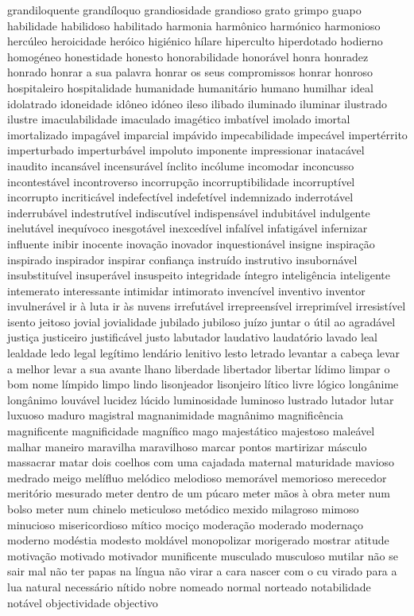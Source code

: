 \begin{appendices}
grandiloquente grand\'{i}loquo grandiosidade grandioso grato grimpo guapo habilidade habilidoso habilitado harmonia harm\^{o}nico harm\'{o}nico harmonioso herc\'{u}leo heroicidade her\'{o}ico higi\'{e}nico h\'{i}lare hiperculto hiperdotado hodierno homog\'{e}neo honestidade honesto honorabilidade honor\'{a}vel honra honradez honrado honrar a sua palavra honrar os seus compromissos honrar honroso hospitaleiro hospitalidade humanidade humanit\'{a}rio humano humilhar ideal idolatrado idoneidade id\^{o}neo id\'{o}neo ileso ilibado iluminado iluminar ilustrado ilustre imaculabilidade imaculado imag\'{e}tico imbat\'{i}vel imolado imortal imortalizado impag\'{a}vel imparcial imp\'{a}vido impecabilidade impec\'{a}vel impert\'{e}rrito imperturbado imperturb\'{a}vel impoluto imponente impressionar inatac\'{a}vel inaudito incans\'{a}vel incensur\'{a}vel \'{i}nclito inc\'{o}lume incomodar inconcusso incontest\'{a}vel incontroverso incorrup\c{c}\~ao incorruptibilidade incorrupt\'{i}vel incorrupto incritic\'{a}vel indefect\'{i}vel indefet\'{i}vel indemnizado inderrot\'{a}vel inderrub\'{a}vel indestrut\'{i}vel indiscut\'{i}vel indispens\'{a}vel indubit\'{a}vel indulgente inelut\'{a}vel inequ\'{i}voco inesgot\'{a}vel inexced\'{i}vel infal\'{i}vel infatig\'{a}vel infernizar influente inibir inocente inova\c{c}\~ao inovador inquestion\'{a}vel insigne inspira\c{c}\~ao inspirado inspirador inspirar confian\c{c}a instru\'{i}do instrutivo insuborn\'{a}vel insubstitu\'{i}vel insuper\'{a}vel insuspeito integridade \'{i}ntegro intelig\^{e}ncia inteligente intemerato interessante intimidar intimorato invenc\'{i}vel inventivo inventor invulner\'{a}vel ir \`{a} luta ir \`{a}s nuvens irrefut\'{a}vel irrepreens\'{i}vel irreprim\'{i}vel irresist\'{i}vel isento jeitoso jovial jovialidade jubilado jubiloso ju\'{i}zo juntar o \'{u}til ao agrad\'{a}vel justi\c{c}a justiceiro justific\'{a}vel justo labutador laudativo laudat\'{o}rio lavado leal lealdade ledo legal leg\'{i}timo lend\'{a}rio lenitivo lesto letrado levantar a cabe\c{c}a levar a melhor levar a sua avante lhano liberdade libertador libertar l\'{i}dimo limpar o bom nome l\'{i}mpido limpo lindo lisonjeador lisonjeiro l\'{i}tico livre l\'{o}gico long\^{a}nime long\^{a}nimo louv\'{a}vel lucidez l\'{u}cido luminosidade luminoso lustrado lutador lutar luxuoso maduro magistral magnanimidade magn\^{a}nimo magnific\^{e}ncia magnificente magnificidade magn\'{i}fico mago majest\'{a}tico majestoso male\'{a}vel malhar maneiro maravilha maravilhoso marcar pontos martirizar m\'{a}sculo massacrar matar dois coelhos com uma cajadada maternal maturidade mavioso medrado meigo mel\'{i}fluo mel\'{o}dico melodioso memor\'{a}vel memorioso merecedor merit\'{o}rio mesurado meter dentro de um p\'{u}caro meter m\~aos \`{a} obra meter num bolso meter num chinelo meticuloso met\'{o}dico mexido milagroso mimoso minucioso misericordioso m\'{i}tico moci\c{c}o modera\c{c}\~ao moderado moderna\c{c}o moderno mod\'{e}stia modesto mold\'{a}vel monopolizar morigerado mostrar atitude motiva\c{c}\~ao motivado motivador munificente musculado musculoso mutilar n\~ao se sair mal n\~ao ter papas na l\'{i}ngua n\~ao virar a cara nascer com o cu virado para a lua natural necess\'{a}rio n\'{i}tido nobre nomeado normal norteado notabilidade not\'{a}vel objectividade objectivo 
\end{appendices}
